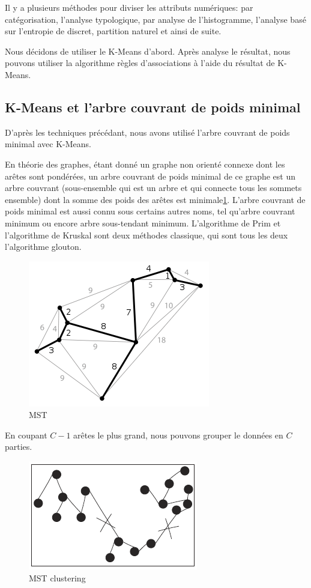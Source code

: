  Il y a plusieurs méthodes pour diviser les attributs numériques: par catégorisation, l'analyse typologique, par analyse de l'histogramme, l'analyse basé sur l'entropie de discret, partition naturel et ainsi de suite. 
 
 Nous décidons de utiliser le K-Means d'abord. Après analyse le résultat, nous pouvons utiliser la algorithme règles d'associations à l'aide du résultat de K-Means.

\subsection{K-Means et l'arbre couvrant de poids minimal }
D'après les techniques précédant, nous avons utilisé l'arbre couvrant de poids minimal avec K-Means.

En théorie des graphes, étant donné un graphe non orienté connexe dont les arêtes sont pondérées, un arbre couvrant de poids minimal de ce graphe est un arbre couvrant (sous-ensemble qui est un arbre et qui connecte tous les sommets ensemble) dont la somme des poids des arêtes est minimale\ref{fig:mst}. L'arbre couvrant de poids minimal est aussi connu sous certains autres noms, tel qu'arbre couvrant minimum ou encore arbre sous-tendant minimum. L'algorithme de Prim et l'algorithme de Kruskal sont deux méthodes classique, qui sont tous les deux l'algorithme glouton. 

\begin{figure}[H]
\centering
\includegraphics[width=0.5\linewidth]{images/mst}
\caption{MST}
\label{fig:mst}
\end{figure}

En coupant $C-1$ arêtes le plus grand, nous pouvons grouper le données en $C$ parties.
\begin{figure}[H]
\centering
\includegraphics[width=0.4\linewidth]{images/mstc}
\caption{MST clustering}
\label{fig:mstc}
\end{figure}

